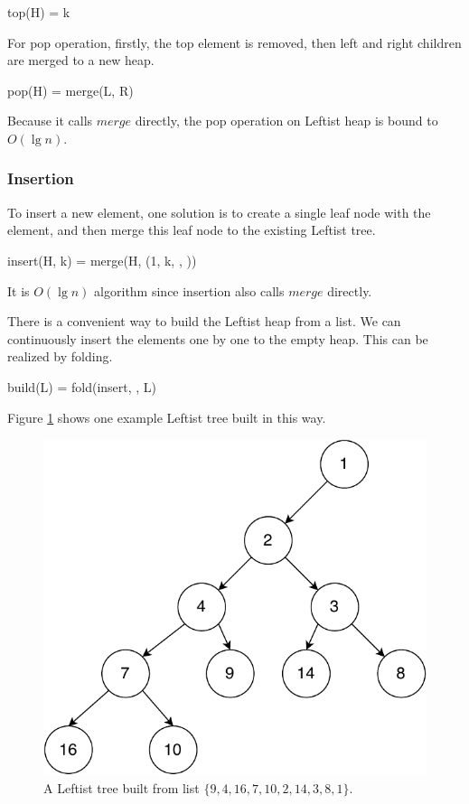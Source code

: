 \documentclass[b5paper]{article}
\begin{document}
\be
top(H) = k
\ee

For pop operation, firstly, the top element is removed, then
left and right children are merged to a new heap.

\be
pop(H) = merge(L, R)
\ee

Because it calls $merge$ directly, the pop operation on Leftist heap is bound
to $O(\lg n)$.

\subsubsection{Insertion}

To insert a new element, one solution is to create a single
leaf node with the element, and then merge this leaf node to
the existing Leftist tree.

\be
insert(H, k) = merge(H, (1, k, \phi, \phi))
\ee

It is $O(\lg n)$ algorithm since insertion also calls $merge$ directly.

There is a convenient way to build the Leftist heap from
a list. We can continuously insert the elements one by one
to the empty heap. This can be realized by folding.

\be
build(L) = fold(insert, \phi, L)
\ee

Figure \ref{fig:leftist-tree} shows one example Leftist tree
built in this way.

\begin{figure}[htbp]
   \begin{center}
   	  \includegraphics[scale=0.5]{img/leftist-tree}
    \caption{A Leftist tree built from list $\{9, 4, 16, 7, 10, 2, 14, 3, 8, 1\}$.}
    \label{fig:leftist-tree}
   \end{center}
\end{figure}
\end{document}
